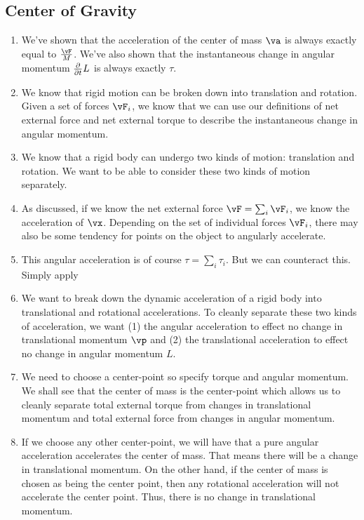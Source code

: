 \subsection{Center of Gravity}

\begin{enumerate}
  \item We've shown that the acceleration of the center of mass $\va$ is
  always exactly equal to $\frac{\vF}{M}$. We've also shown that the
  instantaneous change in angular momentum $\frac{\partial }{\partial t} L$ is always
  exactly $\tau$.

  \item We know that rigid motion can be broken down into translation
  and rotation. Given a set of forces $\vF_i$, we know that we can use
  our definitions of net external force and net external torque to
  describe the instantaneous change in angular momentum.

  \item We know that a rigid body can undergo two kinds of motion:
  translation and rotation. We want to be able to consider these two
  kinds of motion separately.

  \item As discussed, if we know the net external force $\vF = \sum_i
  \vF_i$, we know the acceleration of $\vx$. Depending on the set of
  individual forces $\vF_i$, there may also be some tendency for points
  on the object to angularly accelerate.

  \item This angular acceleration is of course $\tau = \sum_i \tau_i$.
  But we can counteract this. Simply apply

  \item We want to break down the dynamic acceleration of a rigid body
  into translational and rotational accelerations. To cleanly separate
  these two kinds of acceleration, we want (1) the angular acceleration
  to effect no change in translational momentum $\vp$ and (2) the
  translational acceleration to effect no change in angular momentum
  $L$.

  \item We need to choose a center-point so specify torque and angular
  momentum. We shall see that the center of mass is the center-point
  which allows us to cleanly separate total external torque from changes
  in translational momentum and total external force from changes in
  angular momentum.

  \item If we choose any other center-point, we will have that a pure
  angular acceleration accelerates the center of mass. That means there
  will be a change in translational momentum. On the other hand, if the
  center of mass is chosen as being the center point, then any
  rotational acceleration will not accelerate the center point. Thus,
  there is no change in translational momentum.


\end{enumerate}
